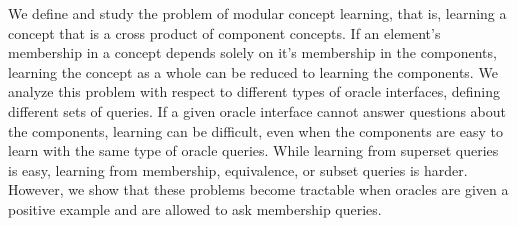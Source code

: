 We define and study the problem of modular concept learning, that is, learning a concept that is a cross product of component concepts.
If an element's membership in a concept depends solely on it's membership in the components, learning the concept as a whole can be reduced to learning the components. 
We analyze this problem with respect to different types of oracle interfaces, defining different sets of queries.
If a given oracle interface cannot answer questions about the components, learning can be difficult, even when the components are easy to learn with the same type of oracle queries.
While learning from superset queries is easy, learning from membership, equivalence, or subset queries is harder. 
However, we show that these problems become tractable when oracles are given a positive example and are allowed to ask membership queries.